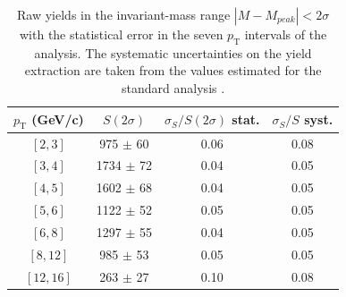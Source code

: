 \documentclass[b5paper,10pt,twoside,oldstyle,classica]{toptesi}
\newcommand{\pt}{p_\text{T}}
\begin{document}
\begin{table}[tb]
\centering 
\begin{center} %
\renewcommand\arraystretch{1.1} 
\fontsize{9}{11}\selectfont
\begin{tabular}{|c|c|c|c|}
\hline
$\pt$ (GeV/c) & $S(2\sigma)$ & $\sigma_S/S(2\sigma)$ stat. & $\sigma_S/S$ syst.\\
\hline
$[2,3]$ & 975 $\pm$ 60 & 0.06 & 0.08\\
$[3,4]$ & 1734 $\pm$ 72 & 0.04 & 0.05\\
$[4,5]$ & 1602 $\pm$ 68 & 0.04 & 0.05\\
$[5,6]$ & 1122 $\pm$ 52 & 0.05 & 0.05\\
$[6,8]$ & 1297 $\pm$ 55 & 0.04 & 0.05\\
$[8,12]$ & 985 $\pm$ 53 & 0.05 & 0.05\\
$[12,16]$ & 263 $\pm$ 27 & 0.10 & 0.08\\
\hline
\end{tabular}
\caption{Raw yields in the invariant-mass range $|M-M_{peak}|<2\sigma$ with the statistical error in the seven $\pt$ intervals of the analysis. The systematic uncertainties on the yield extraction are taken from the values estimated for the standard analysis \cite{Russo:2015xtz}.}
\label{raw_yields_2sigma}
\end{center} 
\end{table}
\end{document}
